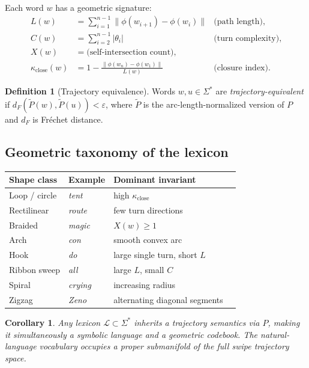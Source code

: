 \documentclass[12pt,a4paper]{article}
\theoremstyle{plain}
\newtheorem{corollary}[theorem]{Corollary}
\theoremstyle{definition}
\newtheorem{definition}[theorem]{Definition}
\begin{document}
Each word $w$ has a geometric signature:
\begin{align*}
L(w) &= \textstyle\sum_{i=1}^{n-1}\|\phi(w_{i+1})-\phi(w_i)\|
  &\text{(path length)},\\
C(w) &= \textstyle\sum_{i=2}^{n-1}|\theta_i|
  &\text{(turn complexity)},\\
X(w) &= \text{(self-intersection count)},\\
\kappa_{\text{close}}(w)
  &= 1-\tfrac{\|\phi(w_n)-\phi(w_1)\|}{L(w)}
  &\text{(closure index)}.
\end{align*}

\begin{definition}[Trajectory equivalence]
Words $w,u\in\Sigma^*$ are \emph{trajectory-equivalent} if
$d_F(\widetilde P(w),\widetilde P(u))<\varepsilon$,
where $\widetilde P$ is the arc-length-normalized version of $P$ and $d_F$
is Fréchet distance.
\end{definition}

\subsection{Geometric taxonomy of the lexicon}

\begin{center}
\begin{tabular}{llll}
\toprule
Shape class & Example & Dominant invariant \\
\midrule
Loop / circle   & \textit{tent}   & high $\kappa_{\text{close}}$ \\
Rectilinear     & \textit{route}  & few turn directions \\
Braided         & \textit{magic}  & $X(w)\geq 1$ \\
Arch            & \textit{con}    & smooth convex arc \\
Hook            & \textit{do}     & large single turn, short $L$ \\
Ribbon sweep    & \textit{all}    & large $L$, small $C$ \\
Spiral          & \textit{crying} & increasing radius \\
Zigzag          & \textit{Zeno}   & alternating diagonal segments \\
\bottomrule
\end{tabular}
\end{center}

\begin{corollary}
Any lexicon $\mathcal{L}\subset\Sigma^*$ inherits a trajectory semantics via
$P$, making it simultaneously a symbolic language and a geometric codebook.
The natural-language vocabulary occupies a proper submanifold of the full swipe
trajectory space.
\end{corollary}
\end{document}

